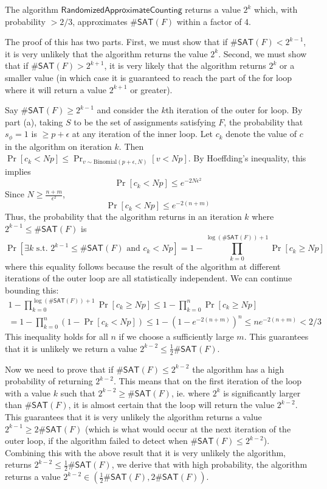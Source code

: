 \documentclass{article}
\begin{document}
The algorithm $\mathsf{RandomizedApproximateCounting}$ returns a value $2^k$ which,
with probability $> 2/3$, approximates $\#\mathsf{SAT}(F)$ within a factor of 4.

The proof of this has two parts.
First, we must show that if $\#\mathsf{SAT}(F) < 2^{k-1}$,
it is very unlikely that the algorithm returns the value $2^k$.
Second, we must show that if $\#\mathsf{SAT}(F) > 2^{k+1}$,
it is very likely that the algorithm returns $2^k$
or a smaller value (in which case it is guaranteed to reach the part of
the for loop where it will return a value $2^{k+1}$ or greater).

Say $\#\mathsf{SAT}(F) \geq 2^{k-1}$  and consider the $k$th iteration of the
outer for loop.
By part (a), taking $S$ to be the set of assignments satisfying $F$,
the probability that $s_\phi = 1$ is $\geq p + \epsilon$
at any iteration of the inner loop.
Let $c_k$ denote the value of $c$ in the algorithm on iteration $k$.
Then $\Pr[c_k < Np] \leq \Pr_{v \sim \text{Binomial}(p + \epsilon, N)}[v < Np]$.
By Hoeffding's inequality, this implies
$$
\Pr[c_k < Np] \leq e^{-2N\epsilon^2}
$$
Since $N \geq \frac{n + m}{\epsilon^2}$,
$$
\Pr[c_k < Np] \leq e^{-2(n + m)}
$$
Thus, the probability that the algorithm returns in an iteration $k$
where $2^{k-1} \leq \#\mathsf{SAT}(F)$ is
$$
\Pr[\exists k \text{ s.t. }2^{k-1} \leq \#\mathsf{SAT}(F) \text{ and } c_k < Np] = 1 - \prod_{k=0}^{\log(\#\mathsf{SAT}(F)) + 1}{\Pr[c_k \geq Np]}
$$
where this equality follows because the result of the algorithm at different iterations of the outer loop are all statistically independent.
We can continue bounding this:
\begin{multline*}
1 - \prod_{k=0}^{\log(\#\mathsf{SAT}(F)) + 1}{\Pr[c_k \geq Np]}
\leq 1 - \prod_{k = 0}^n{\Pr[c_k \geq Np]} \\
= 1 - \prod_{k = 0}^n{(1 - \Pr[c_k < Np])} 
\leq 1 - (1 - e^{-2(n + m)})^n
\leq ne^{-2(n + m)}
< 2/3
\end{multline*}
This inequality holds for all $n$ if we choose a sufficiently large $m$.
This guarantees that it is unlikely we return a value $2^{k-2} \leq \frac{1}{2}\#\mathsf{SAT}(F)$.

\medskip
Now we need to prove that 
if $\#\mathsf{SAT}(F) \leq 2^{k-2}$ the algorithm has a high probability of returning
$2^{k-2}$.
This means that on the first iteration of the loop with a value $k$ such that
$2^{k-2} \geq \#\mathsf{SAT}(F)$, ie. where $2^k$ is significantly larger
than $\#\mathsf{SAT}(F)$, it is almost certain that
the loop will return the value $2^{k-2}$.
This guarantees that it is very unlikely
the algorithm returns a value $2^{k-1} \geq 2\#\mathsf{SAT}(F)$
(which is what would occur at the next iteration of the outer loop,
if the algorithm failed to detect when $\#\mathsf{SAT}(F) \leq 2^{k-2}$).
Combining this with the above result that it is very unlikely
the algorithm, returns $2^{k-2} \leq \frac{1}{2}\#\mathsf{SAT}(F)$,
we derive that with high probability, the algorithm returns
a value $2^{k-2} \in (\frac{1}{2}\#\mathsf{SAT}(F), 2\#\mathsf{SAT}(F))$.
\end{document}
